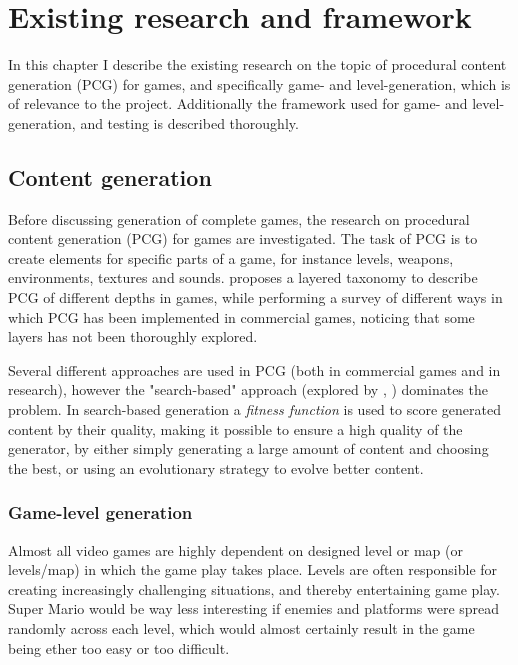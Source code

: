 \documentclass[a4paper,titlepage,final]{report}
\begin{document}
\chapter{Existing research and framework}
\label{ch_existingresearch}
In this chapter I describe the existing research on the topic of procedural content generation (PCG) for games, and specifically game- and level-generation, which is of relevance to the project.
Additionally the framework used for game- and level-generation, and testing is described thoroughly.



\section{Content generation}
\label{sec_contengen}
Before discussing generation of complete games, the research on procedural content generation (PCG) for games are investigated. 
The task of PCG is to create elements for specific parts of a game, for instance levels, weapons, environments, textures and sounds. 
\citet{hendrikx2013procedural} proposes a layered taxonomy to describe PCG of different depths in games, while performing a survey of different ways in which PCG has been implemented in commercial games, noticing that some layers has not been thoroughly explored.

Several different approaches are used in PCG (both in commercial games and in research), however the "search-based" approach (explored by \citet{togelius11search}, \citet{pcgbook:ch2}) dominates the problem.
In search-based generation a \textit{fitness function} is used to score generated content by their quality, making it possible to ensure a high quality of the generator, by either simply generating a large amount of content and choosing the best, or using an evolutionary strategy to evolve better content.




\subsection{Game-level generation}
Almost all video games are highly dependent on designed level or map (or levels/map) in which the game play takes place. Levels are often responsible for creating increasingly challenging situations, and thereby entertaining game play. Super Mario would be way less interesting if enemies and platforms were spread randomly across each level, which would almost certainly result in the game being ether too easy or too difficult.
\end{document}
